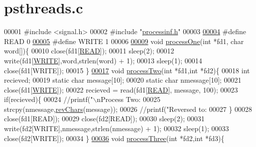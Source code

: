 \hypertarget{psthreads_8c_source}{\section{psthreads.\-c}
}

\begin{DoxyCode}
00001 \textcolor{preprocessor}{#include <signal.h>}
00002 \textcolor{preprocessor}{#include "\hyperlink{processinf_8h}{processinf.h}"}
00003 
\hypertarget{psthreads_8c_source_l00004}{}\hyperlink{psthreads_8c_ada74e7db007a68e763f20c17f2985356}{00004} \textcolor{preprocessor}{#define READ 0}
\hypertarget{psthreads_8c_source_l00005}{}\hyperlink{psthreads_8c_aa10f470e996d0f51210d24f442d25e1e}{00005} \textcolor{preprocessor}{}\textcolor{preprocessor}{#define WRITE 1}
00006 \textcolor{preprocessor}{}
\hypertarget{psthreads_8c_source_l00009}{}\hyperlink{psthreads_8c_ad770c3fce36513614f685761ab978c84}{00009} \textcolor{keywordtype}{void} \hyperlink{psthreads_8c_ad770c3fce36513614f685761ab978c84}{processOne}(\textcolor{keywordtype}{int} *fd1, \textcolor{keywordtype}{char} word[])\{
00010 close(fd1[\hyperlink{psthreads_8c_ada74e7db007a68e763f20c17f2985356}{READ}]);
00011 sleep(2);
00012 write(fd1[\hyperlink{psthreads_8c_aa10f470e996d0f51210d24f442d25e1e}{WRITE}],word,strlen(word) + 1);
00013 sleep(1);
00014 close(fd1[WRITE]);
00015 \}
\hypertarget{psthreads_8c_source_l00017}{}\hyperlink{psthreads_8c_a41286be8a60549556fd52a785e55ceb3}{00017} \textcolor{keywordtype}{void} \hyperlink{psthreads_8c_a41286be8a60549556fd52a785e55ceb3}{processTwo}(\textcolor{keywordtype}{int} *fd1,\textcolor{keywordtype}{int} *fd2)\{
00018 \textcolor{keywordtype}{int} recieved;
00019 \textcolor{keyword}{static} \textcolor{keywordtype}{char} message[10];
00020 \textcolor{keyword}{static} \textcolor{keywordtype}{char} nmessage[10];
00021 close(fd1[\hyperlink{psthreads_8c_aa10f470e996d0f51210d24f442d25e1e}{WRITE}]);
00022 recieved = read(fd1[\hyperlink{psthreads_8c_ada74e7db007a68e763f20c17f2985356}{READ}], message, 100);
00023 \textcolor{keywordflow}{if}(recieved)\{
00024 \textcolor{comment}{//printf("\(\backslash\)nProcess Two: %
00025 strcpy(nmessage,\hyperlink{processinf_8c_a864995963222a536c6889b97738c70cc}{revChars}(message));
00026 \textcolor{comment}{//printf("Reversed to: %
00027 \}
00028 close(fd1[READ]);
00029 close(fd2[READ]);
00030 sleep(2);
00031 write(fd2[WRITE],nmessage,strlen(nmessage) + 1);
00032 sleep(1);
00033 close(fd2[WRITE]);
00034 \}
\hypertarget{psthreads_8c_source_l00036}{}\hyperlink{psthreads_8c_aa9e93a11d641259d16a36df89c644d00}{00036} \textcolor{keywordtype}{void} \hyperlink{psthreads_8c_aa9e93a11d641259d16a36df89c644d00}{processThree}(\textcolor{keywordtype}{int} *fd2,\textcolor{keywordtype}{int} *fd3)\{
}}
\end{DoxyCode}
